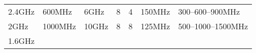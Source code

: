 \begin{longtable}[]{@{}lllllll@{}}
\endhead
\begin{minipage}[t]{0.14\columnwidth}\raggedright\strut
	2.4GHz\strut
\end{minipage} & \begin{minipage}[t]{0.15\columnwidth}\raggedright\strut
600MHz\strut
\end{minipage} & \begin{minipage}[t]{0.09\columnwidth}\raggedright\strut
6GHz\strut
\end{minipage} & \begin{minipage}[t]{0.06\columnwidth}\raggedright\strut
8\strut
\end{minipage} & \begin{minipage}[t]{0.07\columnwidth}\raggedright\strut
4\strut
\end{minipage} & \begin{minipage}[t]{0.14\columnwidth}\raggedright\strut
150MHz\strut
\end{minipage} & \begin{minipage}[t]{0.14\columnwidth}\raggedright\strut
300--600--900MHz\strut
\end{minipage}\tabularnewline
\begin{minipage}[t]{0.14\columnwidth}\raggedright\strut
	2GHz\strut
\end{minipage} & \begin{minipage}[t]{0.15\columnwidth}\raggedright\strut
1000MHz\strut
\end{minipage} & \begin{minipage}[t]{0.09\columnwidth}\raggedright\strut
10GHz\strut
\end{minipage} & \begin{minipage}[t]{0.06\columnwidth}\raggedright\strut
8\strut
\end{minipage} & \begin{minipage}[t]{0.07\columnwidth}\raggedright\strut
8\strut
\end{minipage} & \begin{minipage}[t]{0.14\columnwidth}\raggedright\strut
125MHz\strut
\end{minipage} & \begin{minipage}[t]{0.14\columnwidth}\raggedright\strut
500--1000--1500MHz\strut
\end{minipage}\tabularnewline
\begin{minipage}[t]{0.14\columnwidth}\raggedright\strut
	1.6GHz\strut
\end{minipage} & \begin{minipage}[t]{0.15\columnwidth}\raggedright\strut

\end{minipage}
\end{longtable}
